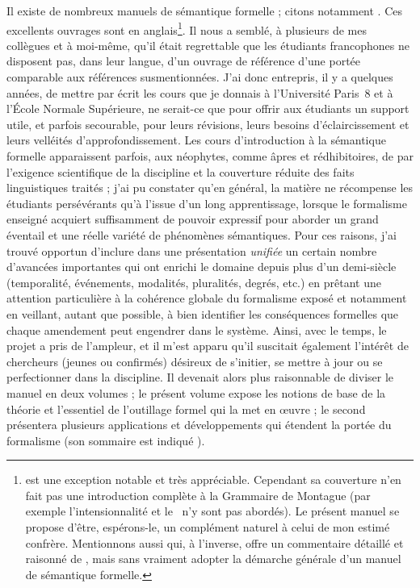 \begin{refsection}


\sloppy
Il existe de nombreux manuels de sémantique formelle ; citons notamment  \citet{DWP:81,ChierchiaMcCG:90,Gamut:1,Gamut:2,Cann:94,HeimKratzer:97,dSwrt:98nls,Corb:13,Jacobson:14,Winter:16}.
Ces excellents ouvrages sont en anglais\footnote{\citet{Corb:13} est une exception notable et très appréciable. Cependant sa couverture n'en fait pas une introduction complète à la {Grammaire de Montague} (par exemple l'intensionnalité et le \lcalcul\ n'y sont pas abordés). Le présent manuel se propose d'être, espérons-le, un complément naturel à celui de mon estimé confrère.  Mentionnons aussi \citet{Galm:91} qui, à l'inverse, offre un commentaire détaillé et raisonné de \citet{PTQ}, mais sans vraiment adopter la démarche générale d'un manuel de sémantique formelle.}.
Il nous a semblé, à plusieurs de mes collègues et à moi-même, qu'il était regrettable que les étudiants francophones ne disposent pas, dans leur langue, d'un ouvrage de référence d'une portée comparable aux références susmentionnées.
J'ai donc entrepris, il y a quelques années, de mettre par écrit les cours que je donnais à l'Université Paris~8 et à l'École Normale Supérieure, ne serait-ce que  pour offrir aux étudiants un support utile, et parfois secourable,  pour leurs révisions, leurs besoins d'éclaircissement et leurs velléités d'approfondissement.  
Les cours d'introduction à la sémantique formelle apparaissent parfois, aux néophytes,  comme âpres et rédhibitoires, de par l'exigence scientifique de la discipline et la couverture réduite des faits linguistiques traités ; j'ai pu constater qu'en général, la matière ne récompense  les étudiants persévérants  qu'à l'issue d'un long apprentissage, lorsque le formalisme  enseigné acquiert suffisamment de pouvoir expressif pour aborder un grand éventail et une réelle variété de phénomènes sémantiques.
Pour ces raisons, j'ai trouvé opportun d'inclure dans une présentation \emph{unifiée} un certain nombre d'avancées importantes qui ont enrichi le domaine depuis plus d'un demi-siècle (temporalité, événements, modalités, pluralités, degrés, etc.) en prêtant une attention particulière à la cohérence globale du formalisme exposé
et notamment en veillant, autant que possible, à bien identifier les conséquences formelles que chaque amendement peut engendrer dans le système. 
Ainsi, avec le temps, le projet a pris de l'ampleur,  
et il m'est apparu qu'il suscitait
également  l'intérêt de chercheurs (jeunes ou confirmés) désireux de s'initier, se mettre à jour ou se perfectionner dans la discipline.
Il devenait alors plus raisonnable de diviser le manuel en deux volumes ; le présent volume expose les notions de base de la théorie et l'essentiel de l'outillage formel qui la met en \oe uvre ; le second présentera plusieurs applications et développements qui étendent la portée du formalisme   (son sommaire est indiqué ).



\end{refsection}
